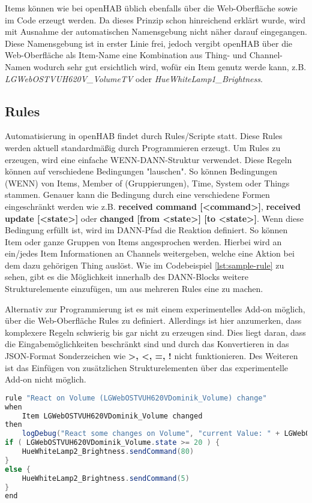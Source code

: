 Items können wie bei openHAB üblich ebenfalls über die Web-Oberfläche sowie im Code erzeugt werden. Da dieses Prinzip schon hinreichend erklärt wurde, wird mit Ausnahme der automatischen Namensgebung nicht näher darauf eingegangen. Diese Namensgebung ist in erster Linie frei, jedoch vergibt openHAB über die Web-Oberfläche als Item-Name eine Kombination aus Thing- und Channel-Namen wodurch sehr gut ersichtlich wird, wofür ein Item genutz werde kann, z.B. \textit{LGWebOSTVUH620V\_VolumeTV} oder \textit{HueWhiteLamp1\_Brightness}.

\subsection{Rules}
Automatisierung in openHAB findet durch Rules/Scripte statt. Diese Rules werden aktuell standardmäßig durch Programmieren erzeugt. Um Rules zu erzeugen, wird eine einfache WENN-DANN-Struktur verwendet. Diese Regeln können auf verschiedene Bedingungen "lauschen". So können Bedingungen (WENN) von Items, Member of (Gruppierungen), Time, System oder Things stammen. Genauer kann die Bedingung durch eine verschiedene Formen eingeschränkt werden wie z.B. \textbf{received command [<command>]},  \textbf{received update [<state>]} oder \textbf{changed [from <state>] [to <state>]}.
Wenn diese Bedingung erfüllt ist, wird im DANN-Pfad die Reaktion definiert. So können Item oder ganze Gruppen von Items angesprochen werden. Hierbei wird an ein/jedes Item Informationen an Channels weitergeben, welche eine Aktion bei dem dazu gehörigen Thing auslöst.
Wie im Codebeispiel \ref{lst:sample-rule} zu sehen, gibt es die Möglichkeit innerhalb des DANN-Blocks weitere Strukturelemente einzufügen, um aus mehreren Rules eine zu machen.

Alternativ zur Programmierung ist es mit einem experimentelles Add-on möglich, über die Web-Oberfläche Rules zu definiert. Allerdings ist hier anzumerken, dass komplexere Regeln schwierig bis gar nicht zu erzeugen sind. Dies liegt daran, dass die Eingabemöglichkeiten beschränkt sind und durch das Konvertieren in das JSON-Format Sonderzeichen wie \textbf{>, <, =, !} nicht funktionieren. Des Weiteren ist das Einfügen von zusätzlichen Strukturelementen über das experimentelle Add-on nicht möglich.

\begin{lstlisting}[language=java,firstnumber=1,caption=Rule Beispiel,label=lst:sample-rule]
rule "React on Volume (LGWebOSTVUH620VDominik_Volume) change"
when
	Item LGWebOSTVUH620VDominik_Volume changed
then
	logDebug("React some changes on Volume", "current Value: " + LGWebOSTVUH620VDominik_Volume.state.toString)
if ( LGWebOSTVUH620VDominik_Volume.state >= 20 ) {
	HueWhiteLamp2_Brightness.sendCommand(80)
}
else {
	HueWhiteLamp2_Brightness.sendCommand(5)
}
end
\end{lstlisting}

